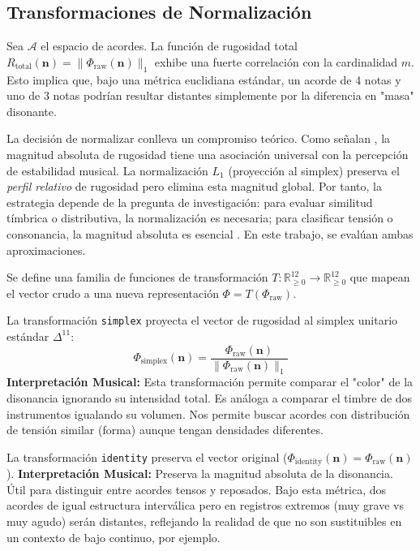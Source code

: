 \subsection{Transformaciones de Normalización}

Sea $\mathcal{A}$ el espacio de acordes. La función de rugosidad total $R_{\text{total}}(\mathbf{n}) = \|\Phi_{\text{raw}}(\mathbf{n})\|_1$ exhibe una fuerte correlación con la cardinalidad $m$. Esto implica que, bajo una métrica euclidiana estándar, un acorde de 4 notas y uno de 3 notas podrían resultar distantes simplemente por la diferencia en "masa" disonante.

La decisión de normalizar conlleva un compromiso teórico. Como señalan , la magnitud absoluta de rugosidad tiene una asociación universal con la percepción de estabilidad musical. La normalización $L_1$ (proyección al simplex) preserva el \textit{perfil relativo} de rugosidad pero elimina esta magnitud global. Por tanto, la estrategia depende de la pregunta de investigación: para evaluar similitud tímbrica o distributiva, la normalización es necesaria; para clasificar tensión o consonancia, la magnitud absoluta es esencial \cite{masinaDyadsConsonanceDissonance2022}. En este trabajo, se evalúan ambas aproximaciones.

Se define una familia de funciones de transformación $T: \mathbb{R}_{\geq 0}^{12} \to \mathbb{R}_{\geq 0}^{12}$ que mapean el vector crudo a una nueva representación $\Phi = T(\Phi_{\text{raw}})$.

\begin{definition}
La transformación \texttt{simplex} proyecta el vector de rugosidad al simplex unitario estándar $\Delta^{11}$:
\begin{equation}
\Phi_{\text{simplex}}(\mathbf{n}) = \frac{\Phi_{\text{raw}}(\mathbf{n})}{\|\Phi_{\text{raw}}(\mathbf{n})\|_1}
\end{equation}
\textbf{Interpretación Musical:} Esta transformación permite comparar el "color" de la disonancia ignorando su intensidad total. Es análoga a comparar el timbre de dos instrumentos igualando su volumen. Nos permite buscar acordes con distribución de tensión similar (forma) aunque tengan densidades diferentes.
\end{definition}

\begin{definition}[Identidad]
La transformación \texttt{identity} preserva el vector original ($\Phi_{\text{identity}}(\mathbf{n}) = \Phi_{\text{raw}}(\mathbf{n})$).
\textbf{Interpretación Musical:} Preserva la magnitud absoluta de la disonancia. Útil para distinguir entre acordes tensos y reposados. Bajo esta métrica, dos acordes de igual estructura interválica pero en registros extremos (muy grave vs muy agudo) serán distantes, reflejando la realidad de que no son sustituibles en un contexto de bajo continuo, por ejemplo.
\end{definition}


